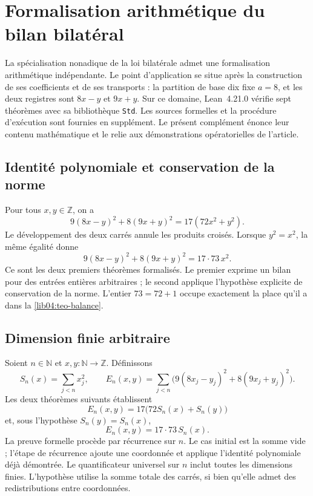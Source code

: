 \section*{Formalisation arithmétique du bilan bilatéral}
\label{libro:formalizacion-lean}

La spécialisation nonadique de la loi bilatérale admet une formalisation
arithmétique indépendante. Le point d’application se situe après la
construction de ses coefficients et de ses transports : la partition de base dix fixe
\(a=8\), et les deux registres sont \(8x-y\) et \(9x+y\). Sur ce domaine,
Lean~4.21.0 vérifie sept théorèmes avec sa bibliothèque \texttt{Std}. Les sources
formelles et la procédure d’exécution sont fournies en supplément.
Le présent complément énonce leur contenu mathématique et le relie aux
démonstrations opératorielles de l’article.

\subsection*{Identité polynomiale et conservation de la norme}

Pour tous \(x,y\in\mathbb Z\), on a
\[
 9(8x-y)^2+8(9x+y)^2=17(72x^2+y^2).
\]
Le développement des deux carrés annule les produits croisés. Lorsque \(y^2=x^2\), la même égalité donne
\[
 9(8x-y)^2+8(9x+y)^2=17\cdot73\,x^2.
\]
Ce sont les deux premiers théorèmes formalisés. Le premier exprime un
bilan pour des entrées entières arbitraires ; le second applique l’hypothèse
explicite de conservation de la norme. L’entier \(73=72+1\) occupe
exactement la place qu’il a dans la \cref{lib04:teo-balance}.

\subsection*{Dimension finie arbitraire}

Soient \(n\in\mathbb N\) et \(x,y:\mathbb N\to\mathbb Z\). Définissons
\[
 S_n(x)=\sum_{j<n}x_j^2,
 \qquad
 E_n(x,y)=\sum_{j<n}\bigl(9(8x_j-y_j)^2+8(9x_j+y_j)^2\bigr).
\]
Les deux théorèmes suivants établissent
\[
 E_n(x,y)=17\bigl(72S_n(x)+S_n(y)\bigr)
\]
et, sous l'hypothèse \(S_n(y)=S_n(x)\),
\[
 E_n(x,y)=17\cdot73\,S_n(x).
\]
La preuve formelle procède par récurrence sur \(n\). Le cas initial est la somme vide ; l'étape de récurrence ajoute une coordonnée et applique l'identité polynomiale déjà démontrée. Le quantificateur universel sur \(n\) inclut toutes les dimensions finies. L'hypothèse utilise la somme totale des carrés, si bien qu'elle admet des redistributions entre coordonnées.

